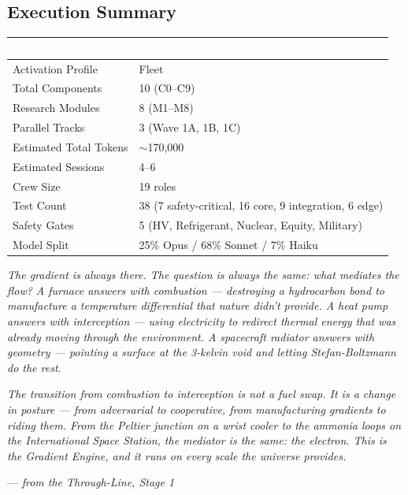 \documentclass[11pt,letterpaper]{article}
\newcommand{\tableheader}[1]{\textbf{\sffamily\textcolor{white}{#1}}}
\begin{document}
\subsection{Execution Summary}

\begin{center}
\begin{tabularx}{\textwidth}{L{5cm}X}
\toprule
{}
\tableheader{Metric} & \tableheader{Value} \\
\midrule
Activation Profile & Fleet \\
Total Components & 10 (C0--C9) \\
Research Modules & 8 (M1--M8) \\
Parallel Tracks & 3 (Wave 1A, 1B, 1C) \\
Estimated Total Tokens & $\sim$170,000 \\
Estimated Sessions & 4--6 \\
Crew Size & 19 roles \\
Test Count & 38 (7 safety-critical, 16 core, 9 integration, 6 edge) \\
Safety Gates & 5 (HV, Refrigerant, Nuclear, Equity, Military) \\
Model Split & 25\% Opus / 68\% Sonnet / 7\% Haiku \\
\bottomrule
\end{tabularx}
\end{center}

\begin{quotebox}
\textit{The gradient is always there. The question is always the same: what mediates the flow? A furnace answers with combustion --- destroying a hydrocarbon bond to manufacture a temperature differential that nature didn't provide. A heat pump answers with interception --- using electricity to redirect thermal energy that was already moving through the environment. A spacecraft radiator answers with geometry --- pointing a surface at the 3-kelvin void and letting Stefan-Boltzmann do the rest.}

\textit{The transition from combustion to interception is not a fuel swap. It is a change in posture --- from adversarial to cooperative, from manufacturing gradients to riding them. From the Peltier junction on a wrist cooler to the ammonia loops on the International Space Station, the mediator is the same: the electron. This is the Gradient Engine, and it runs on every scale the universe provides.}

\vspace{0.5em}
\hfill --- \textit{from the Through-Line, Stage 1}
\end{quotebox}
\end{document}
